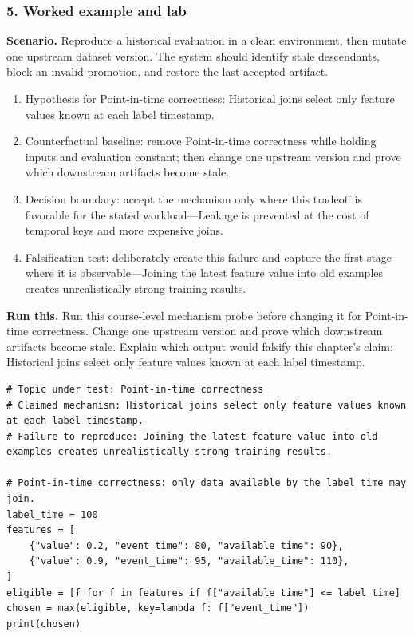 \subsubsection*{5. Worked example and lab}
\textbf{Scenario.} Reproduce a historical evaluation in a clean environment, then mutate one upstream dataset version. The system should identify stale descendants, block an invalid promotion, and restore the last accepted artifact.
\begin{enumerate}
\item Hypothesis for Point-in-time correctness: Historical joins select only feature values known at each label timestamp.
\item Counterfactual baseline: remove Point-in-time correctness while holding inputs and evaluation constant; then change one upstream version and prove which downstream artifacts become stale.
\item Decision boundary: accept the mechanism only where this tradeoff is favorable for the stated workload—Leakage is prevented at the cost of temporal keys and more expensive joins.
\item Falsification test: deliberately create this failure and capture the first stage where it is observable—Joining the latest feature value into old examples creates unrealistically strong training results.
\end{enumerate}
\textbf{Run this.} Run this course-level mechanism probe before changing it for Point-in-time correctness. Change one upstream version and prove which downstream artifacts become stale. Explain which output would falsify this chapter's claim: Historical joins select only feature values known at each label timestamp.
\begin{Verbatim}[fontsize=\scriptsize]
# Topic under test: Point-in-time correctness
# Claimed mechanism: Historical joins select only feature values known at each label timestamp.
# Failure to reproduce: Joining the latest feature value into old examples creates unrealistically strong training results.

# Point-in-time correctness: only data available by the label time may join.
label_time = 100
features = [
    {"value": 0.2, "event_time": 80, "available_time": 90},
    {"value": 0.9, "event_time": 95, "available_time": 110},
]
eligible = [f for f in features if f["available_time"] <= label_time]
chosen = max(eligible, key=lambda f: f["event_time"])
print(chosen)
\end{Verbatim}
